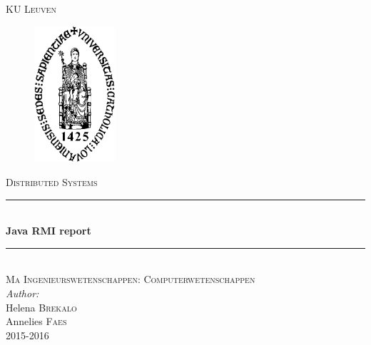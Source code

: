 \documentclass[10pt,a4paper]{report}
\author{Helena Brekalo and Annelies Faes}
\begin{document}
\begin{titlepage}

\newcommand{\HRule}{\rule{\linewidth}{0.5mm}} %

\center %
 
\textsc{\LARGE KU Leuven}\\[1.5cm] %


\begin{figure}[ht!]
\centering
\includegraphics[width=30mm]{logo_theo.png}
\label{les2_01}
\end{figure}

\textsc{\Large Distributed Systems}\\[0.5cm] %


\HRule \\[0.4cm]
{ \huge \bfseries Java RMI report}\\[0.4cm]
\HRule \\[1.5cm]


\textsc{\large Ma Ingenieurswetenschappen: Computerwetenschappen}\\[0.5cm] %


\Large \emph{Author:}\\
Helena \textsc{Brekalo}\\
Annelies \textsc{Faes}\\[2cm]


{\large 2015-2016}\\[3cm] %

\vfill %

\end{titlepage}
\end{document}
